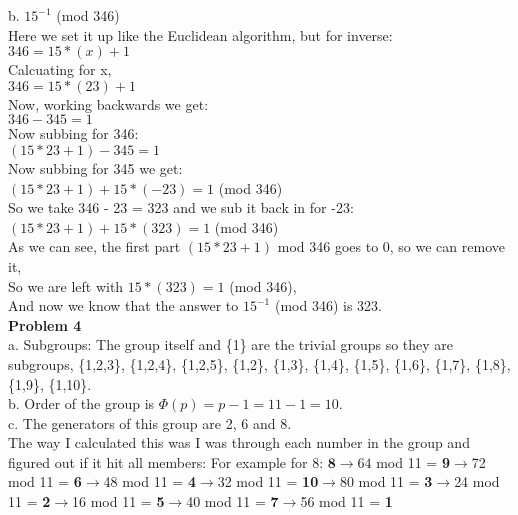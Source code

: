 \documentclass[10pt]{article}
\begin{document}
\noindent b. $15^{-1}$ (mod 346)\\
\indent Here we set it up like the Euclidean algorithm, but for inverse:\\
\indent $346 = 15 * (x) + 1$\\
\indent Calcuating for x,\\
\indent $346 = 15 * (23) + 1$\\
\indent Now, working backwards we get:\\
\indent $346 - 345 = 1$\\
\indent Now subbing for 346:\\
\indent $(15*23 + 1) - 345 = 1$\\
\indent Now subbing for 345 we get:\\
\indent $(15*23 + 1) + 15*(-23) = 1$ (mod 346)\\
\indent So we take 346 - 23 = 323 and we sub it back in for -23:\\
\indent $(15*23 + 1) + 15*(323) = 1$ (mod 346)\\
\indent As we can see, the first part $(15*23 + 1)$ mod 346 goes to 0, so we can remove it,\\
\indent So we are left with $15*(323) = 1$ (mod 346),\\
\indent And now we know that the answer to $15^{-1}$ (mod 346) is 323.\\



\noindent \large \textbf{Problem 4}\\
a. Subgroups: The group itself and \{1\} are the trivial groups so they are subgroups, \{1,2,3\}, \{1,2,4\}, \{1,2,5\}, \{1,2\}, \{1,3\}, \{1,4\}, \{1,5\}, 
\{1,6\}, \{1,7\}, \{1,8\}, \{1,9\}, \{1,10\}.\\


\noindent b. Order of the group is $\Phi(p) = p - 1 = 11 - 1 = 10$.\\

\noindent c. The generators of this group are 2, 6 and 8.\\
\indent The way I calculated this was I was through each number in the group and figured out if it hit all members:
\indent For example for 8: $\textbf{8}\rightarrow64$ mod 11 = \textbf{9}$\rightarrow$72 mod 11 = \textbf{6}$\rightarrow$48 mod 11 = \textbf{4}$\rightarrow$32 mod 11 = \textbf{10}$\rightarrow$80 mod 11 = \textbf{3}$\rightarrow$24 mod 11 = \textbf{2}$\rightarrow$16 mod 11 = \textbf{5}$\rightarrow$40 mod 11 = \textbf{7}$\rightarrow$56 mod 11 = \textbf{1}\\
\end{document}
